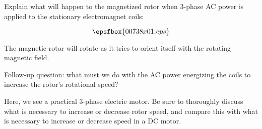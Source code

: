 

Explain what will happen to the magnetized rotor when 3-phase AC power is applied to the stationary electromagnet coils:

$$\epsfbox{00738x01.eps}$$







The magnetic rotor will rotate as it tries to orient itself with the rotating magnetic field.

\vskip 10pt

Follow-up question: what must we do with the AC power energizing the coils to increase the rotor's rotational speed?







Here, we see a practical 3-phase electric motor.  Be sure to thoroughly discuss what is necessary to increase or decrease rotor speed, and compare this with what is necessary to increase or decrease speed in a DC motor.





